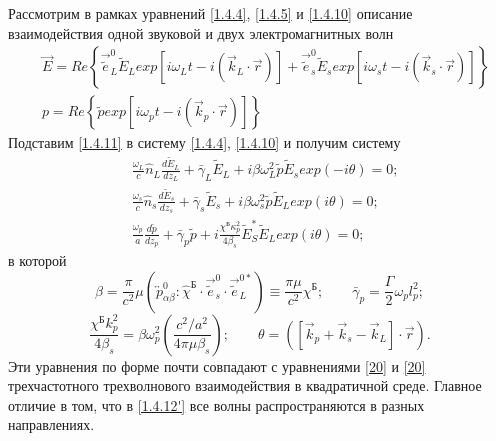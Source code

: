 \documentclass[a4paper]{article}
\begin{document}
Рассмотрим в рамках уравнений \eqref{1.4.4}, \eqref{1.4.5} и \eqref{1.4.10} описание взаимодействия одной звуковой и двух электромагнитных волн 
\begin{equation}
	\begin{split}
		&\vec{E}=Re\left\{\vec{\tilde{e}}_{L}^{0}\tilde{E}_{L}exp\left[i\omega_{L}t-i(\vec{k}_{L}\cdot\vec{r})\right]+\vec{\tilde{e}}_{s}^{0}\tilde{E}_{s}exp\left[i\omega_{s}t-i(\vec{k}_{s}\cdot\vec{r})\right]\right\}\\
		&p=Re\left\{\tilde{p}exp\left[i\omega_{p}t-i(\vec{k}_{p}\cdot\vec{r})\right]\right\}
	\end{split}	
	\label{1.4.11}
\end{equation}
Подставим \eqref{1.4.11} в систему \eqref{1.4.4}, \eqref{1.4.10} и получим систему 
\begin{equation}
	\begin{split}
		&\frac{\omega_{L}}{c}\hat{n}_{L}\frac{d\tilde{E}_{L}}{dz_{L}}+\bar{\gamma}_{L}\tilde{E}_{L}+i\beta\omega^{2}_{L}\tilde{p}\tilde{E}_{s}exp(-i\theta)=0;\\		
		&\frac{\omega_{s}}{c}\hat{n}_{s}\frac{d\tilde{E}_{s}}{dz_{s}}+\bar{\gamma}_{s}\tilde{E}_{s}+i\beta\omega^{2}_{s}\tilde{p}\tilde{E}_{L}exp(i\theta)=0;\\		
		&\frac{\omega_{p}}{a}\frac{d\tilde{p}}{dz_{p}}+\bar{\gamma}_{p}\tilde{p}+i\frac{\chi^{\text{Б}}\kappa^{2}_{p}}{4\beta_{s}}\tilde{E}_{S}^{*}\tilde{E}_{L}exp(i\theta)=0;
	\end{split}
\tag{12'}
\label{1.4.12'}
\end{equation}
в которой
\begin{equation}
	\beta=\frac{\pi}{c^{2}}\mu\left(\overleftrightarrow{p}^{0}_{\alpha\beta}:\hat{\chi}^{\text{Б}}\cdot\vec{\tilde{e}}_{s}^{0}\cdot\vec{\tilde{e}}_{L}^{0*}\right)\equiv\frac{\pi\mu}{c^{2}}\chi^{\text{Б}};\qquad\bar{\gamma}_{p}=\frac{\Gamma}{2}\omega_{p}l^{2}_{p};
	\tag{12''}
	\label{1.4.12''}
\end{equation}
\begin{equation}
	\frac{\chi^{\text{Б}}k_{p}^{2}}{4\beta_{s}}=\beta\omega_{p}^{2}\left(\frac{c^{2}/a^{2}}{4\pi\mu\beta_{s}}\right);\qquad\theta=\left(\left[\vec{k}_{p}+\vec{k}_{s}-\vec{k}_{L}\right]\cdot\vec{r}\right).
	\label{1.4.12'''}
	\tag{12'''}
\end{equation}
Эти уравнения по форме почти совпадают с уравнениями \eqref{20} и \eqref{20} трехчастотного трехволнового взаимодействия в квадратичной среде. Главное отличие в том, что в \eqref{1.4.12'} все волны распространяются в разных направлениях. 
\end{document}
